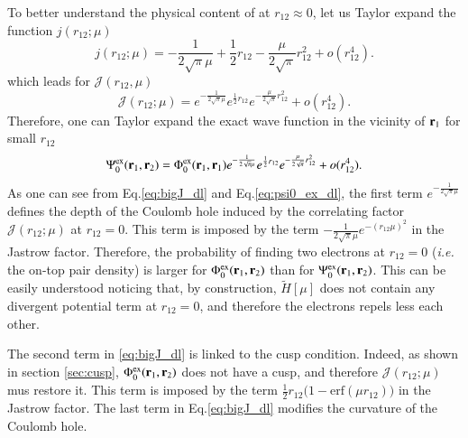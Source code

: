\documentclass[aip,jcp,reprint,noshowkeys,superscriptaddress]{revtex4-1}
\newcommand{\br}[0]{{\bf {r}}}
\newcommand{\psiex}[0]{\Psi^{\text{ex}}_0}
\newcommand{\phiex}[0]{\Phi^{\text{ex}}_0}
\begin{document}
To better understand the physical content of at $r_{12}\approx 0$,  
let us Taylor expand the function $j(r_{12};\mu)$ 
\begin{equation}
 \label{eq:j_dl}
 j(r_{12};\mu) = -\frac{1}{2\sqrt{\pi}\mu} + \frac{1}{2}r_{12} - \frac{\mu}{2\sqrt{\pi}} r_{12}^2 + o(r_{12}^4).
\end{equation}
which leads for $\mathcal{J}(r_{12},\mu)$
\begin{equation}
 \label{eq:bigJ_dl}
 \mathcal{J}(r_{12};\mu) = e^{-\frac{1}{2\sqrt{\pi}\mu}} e^{ \frac{1}{2}r_{12}} e^{- \frac{\mu}{2\sqrt{\pi}} r_{12}^2} + o(r_{12}^4) .
\end{equation}
Therefore, one can Taylor expand the exact wave function in the vicinity of $\br{}_1$ for small $r_{12}$ 
\begin{equation}
 \label{eq:psi0_ex_dl}
 \psiex(\br{}_1,\br{}_2) = \phiex(\br{}_1,\br{}_1)e^{-\frac{1}{2\sqrt{\pi}\mu}} e^{ \frac{1}{2}r_{12}} e^{- \frac{\mu}{2\sqrt{\pi}} r_{12}^2} + o(r_{12}^4) .
\end{equation}
As one can see from Eq.\eqref{eq:bigJ_dl} and Eq.\eqref{eq:psi0_ex_dl}, the first term $e^{-\frac{1}{2\sqrt{\pi}\mu}}$ defines the depth of the Coulomb hole induced by the correlating factor $\mathcal{J}(r_{12};\mu)$ at $r_{12}=0$. 
This term is imposed by the term $- \frac{1}{2\sqrt{\pi}\mu}e^{-(r_{12}\mu)^2}$ in the Jastrow factor. 
Therefore, the probability of finding two electrons at $r_{12}=0$ (\textit{i.e.} the on-top pair density) is larger for $\phiex(\br{}_1,\br{}_2)$ than for $\psiex(\br{}_1,\br{}_2)$.  
This can be easily understood noticing that, by construction, $\tilde{H}[\mu]$ does not contain any divergent potential term at $r_{12}=0$, and therefore the electrons repels less each other.  

The second term in \eqref{eq:bigJ_dl} is linked to the cusp condition. 
Indeed, as shown in section \ref{sec:cusp}, $\phiex(\br{}_1,\br{}_2)$ does not have a cusp, and therefore $\mathcal{J}(r_{12};\mu)$ mus restore it. This term is imposed by the term $\frac{1}{2}r_{12}\bigg( 1 - \text{erf}(\mu r_{12})  \bigg)$ in the Jastrow factor. 
The last term in Eq.\eqref{eq:bigJ_dl} modifies the curvature of the Coulomb hole. 
\end{document}
